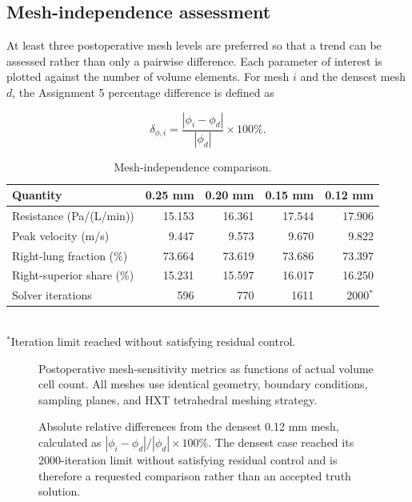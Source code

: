 \documentclass[11pt,a4paper]{article}
\begin{document}
\subsection{Mesh-independence assessment}
\label{sec:mesh_sensitivity}

At least three postoperative mesh levels are preferred so that a trend can be
assessed rather than only a pairwise difference. Each parameter of interest is
plotted against the number of volume elements. For mesh $i$ and the densest mesh
$d$, the Assignment 5 percentage difference is defined as

\begin{equation}
  \delta_{\phi,i} =
  \frac{|\phi_i-\phi_d|}{|\phi_d|}\times 100\%.
  \label{eq:mesh_difference}
\end{equation}

\begin{table}[htbp]
  \centering
  \caption{Mesh-independence comparison.}
  \label{tab:mesh_independence}
  \begin{tabular}{@{}lrrrr@{}}
    \toprule
    Quantity & 0.25 mm & 0.20 mm & 0.15 mm & 0.12 mm \\
    \midrule
    Resistance (Pa/(L/min)) & 15.153 & 16.361 & 17.544 & 17.906 \\
    Peak velocity (m/s) & 9.447 & 9.573 & 9.670 & 9.822 \\
    Right-lung fraction (\%) & 73.664 & 73.619 & 73.686 & 73.397 \\
    Right-superior share (\%) & 15.231 & 15.597 & 16.017 & 16.250 \\
    Solver iterations & 596 & 770 & 1611 & 2000$^*$ \\
    \bottomrule
  \end{tabular}
  \\[2pt]\footnotesize{$^*$Iteration limit reached without satisfying residual control.}
\end{table}

\begin{figure}[htbp]
  \centering
  \resizebox{0.98\textwidth}{!}{}
  \caption{Postoperative mesh-sensitivity metrics as functions of actual volume
  cell count. All meshes use identical geometry, boundary conditions, sampling
  planes, and HXT tetrahedral meshing strategy.}
  \label{fig:mesh_sensitivity}
\end{figure}

\begin{figure}[htbp]
  \centering
  \resizebox{0.98\textwidth}{!}{}
  \caption{Absolute relative differences from the densest 0.12 mm mesh,
  calculated as $|\phi_i-\phi_d|/|\phi_d|\times100\%$. The densest case reached
  its 2000-iteration limit without satisfying residual control and is therefore
  a requested comparison rather than an accepted truth solution.}
  \label{fig:mesh_sensitivity_differences}
\end{figure}
\end{document}
